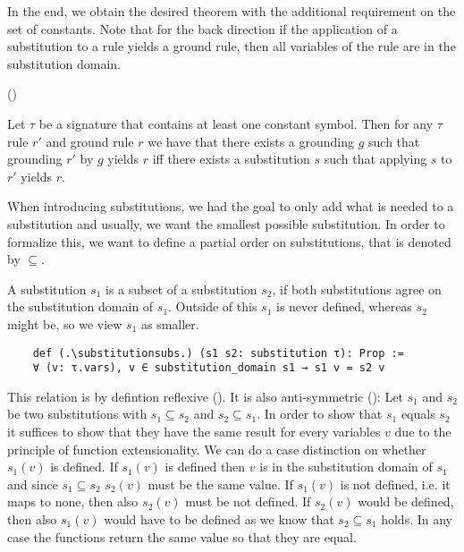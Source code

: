     In the end, we obtain the desired theorem with the additional requirement on the set of constants. Note that for the back direction if the application of a substitution to a rule yields a ground rule, then all variables of the rule are in the substitution domain. 
    
    \noindent(\applySubstitutionRuleIsGroundImplVarsSubsetDomain)
    \begin{theorem}[\groundingSubstitutionEquivalence]\label{trm:groundingSubstitutionEquivalence}
        Let $\tau$ be a signature that contains at least one constant symbol. Then for any $\tau$ rule $r'$ and ground rule $r$ we have that there exists a grounding $g$ such that grounding $r'$ by $g$ yields $r$ iff there exists a substitution $s$ such that applying $s$ to $r'$ yields $r$.
    \end{theorem}

    When introducing substitutions, we had the goal to only add what is needed to a substitution and usually, we want the smallest possible substitution. In order to formalize this, we want to define a partial order on substitutions, that is denoted by $\subseteq$.
    
    A substitution $s_1$ is a subset of a substitution $s_2$, if both substitutions agree on the substitution domain of $s_1$. Outside of this $s_1$ is never defined, whereas $s_2$ might be, so we view $s_1$ as smaller.

    \begin{lstlisting}
    def (.\substitutionsubs.) (s1 s2: substitution τ): Prop :=
    ∀ (v: τ.vars), v ∈ substitution_domain s1 → s1 v = s2 v
    \end{lstlisting}

    This relation is by defintion reflexive (\substitutionsubsrefl). It is also anti-symmetric (\substitutionsubsantisymm): Let $s_1$ and $s_2$ be two substitutions with $s_1 \subseteq s_2$ and $s_2 \subseteq s_1$. In order to show that $s_1$ equals $s_2$ it suffices to show that they have the same result for every variables $v$ due to the principle of function extensionality. We can do a case distinction on whether $s_1(v)$ is defined. If $s_1(v)$ is defined then $v$ is in the substitution domain of $s_1$ and since $s_1 \subseteq s_2$ $s_2(v)$ must be the same value. If $s_1(v)$ is not defined, i.e. it maps to none, then also $s_2(v)$ must be not defined. If $s_2(v)$ would be defined, then also $s_1(v)$ would have to be defined as we know that $s_2 \subseteq s_1$ holds. In any case the functions return the same value so that they are equal.

